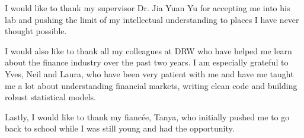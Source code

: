 \begin{acknowledgments}
  
  I would like to thank my supervisor Dr. Jia Yuan Yu for accepting me into his lab and pushing the limit of my intellectual understanding to places I have never thought possible. 
  
  I would also like to thank all my colleagues at DRW who have helped me learn about the finance industry over the past two years. I am especially grateful to Yves, Neil and Laura, who have been very patient with me and have me taught me a lot about understanding financial markets, writing clean code and building robust statistical models.
  
  Lastly, I would like to thank my fiancée, Tanya, who initially pushed me to go back to school while I was still young and had the opportunity. 
\end{acknowledgments}